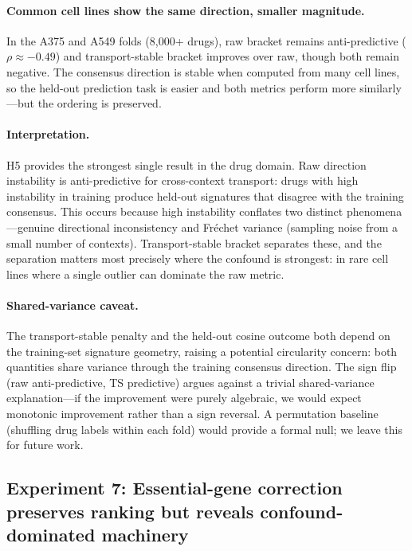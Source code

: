 \documentclass{article}
\begin{document}
\paragraph{Common cell lines show the same direction, smaller magnitude.}
In the A375 and A549 folds (8{,}000+ drugs), raw bracket remains
anti-predictive ($\rho \approx -0.49$) and transport-stable bracket
improves over raw, though both remain negative. The consensus direction
is stable when computed from many cell lines, so the held-out prediction
task is easier and both metrics perform more similarly---but the ordering
is preserved.

\paragraph{Interpretation.}
H5 provides the strongest single result in the drug domain. Raw direction
instability is anti-predictive for cross-context transport: drugs with high
instability in training produce held-out signatures that disagree with the
training consensus. This occurs because high instability conflates two
distinct phenomena---genuine directional inconsistency and Fr\'{e}chet
variance (sampling noise from a small number of contexts). Transport-stable
bracket separates these, and the separation matters most precisely where the
confound is strongest: in rare cell lines where a single outlier can
dominate the raw metric.

\paragraph{Shared-variance caveat.}
The transport-stable penalty and the held-out cosine outcome both depend on
the training-set signature geometry, raising a potential circularity concern:
both quantities share variance through the training consensus direction.
The sign flip (raw anti-predictive, TS predictive) argues against a trivial
shared-variance explanation---if the improvement were purely algebraic,
we would expect monotonic improvement rather than a sign reversal. A
permutation baseline (shuffling drug labels within each fold) would
provide a formal null; we leave this for future work.

\subsection{Experiment 7: Essential-gene correction preserves ranking but reveals confound-dominated machinery}
\end{document}
